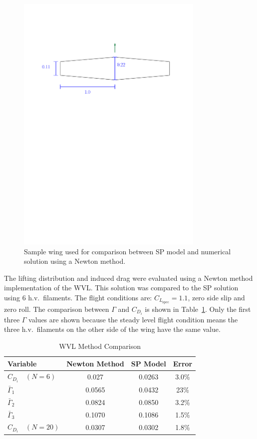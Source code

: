 \documentclass[10pt, a4paper]{article}
\begin{document}
\begin{figure}[h!]
	\begin{center}
	\includegraphics[width=0.8\textwidth]{samplewing.pdf}
    \caption{Sample wing used for comparison between SP model and numerical solution using a Newton method.}
\label{f:samplewing}
\end{center}
\end{figure}

The lifting distribution and induced drag were evaluated using a Newton method implementation of the WVL. This solution was compared to the SP solution using 6 h.v.\ filaments. 
The flight conditions are: $C_{L_{\mathrm{spec}}} = 1.1$, zero side slip and zero roll.  
The comparison between $\Gamma$ and $C_{D_i}$ is shown in Table~\ref{t:spcomp}.
Only the first three $\Gamma$ values are shown because the steady level flight condition means the three h.v.\ filaments on the other side of the wing have the same value.  

\begin{longtable}{lccc}
\caption{WVL Method Comparison}\\
\toprule
\toprule
\label{t:spcomp}
Variable            & Newton Method     & SP Model  & Error  \\ \midrule
$C_{D_i} \quad (N=6)$& 0.027             & 0.0263    & 3.0\%  \\
$\bar{\Gamma}_1$    & 0.0565            & 0.0432    & 23\%   \\
$\bar{\Gamma}_2$    & 0.0824            & 0.0850    & 3.2\%  \\
$\bar{\Gamma}_3$    & 0.1070            & 0.1086    & 1.5\%  \\
$C_{D_i} \quad (N=20)$& 0.0307            & 0.0302    & 1.8\%  \\
\bottomrule
\end{longtable}
\end{document}
